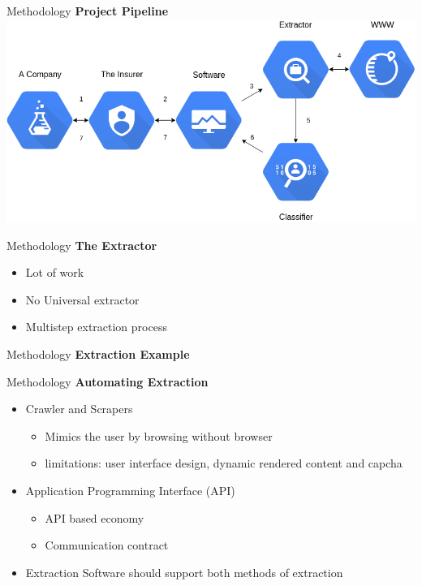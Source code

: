 \begin{frame}[label=metho]{Methodology}
	\textbf{Project Pipeline}
	\includegraphics[width=\textwidth]{images/project_pipeline.png}
\end{frame}


\begin{frame}[label=metho]{Methodology}
	\textbf{The Extractor}
	\begin{itemize}
		\item Lot of work
		\item No Universal extractor
		\item Multistep extraction process
	\end{itemize}
\end{frame}


\begin{frame}[label=metho]{Methodology}
	\textbf{Extraction Example}
	
\end{frame}



\begin{frame}[label=metho]{Methodology}
	\textbf{Automating Extraction}
	\begin{itemize}
		\item Crawler and Scrapers
		\begin{itemize}
			\item Mimics the user by browsing without browser
			\item limitations: user interface design, dynamic rendered content and capcha
		\end{itemize}		
		\item Application Programming Interface (API)
		\begin{itemize}
			\item API based economy
			\item Communication contract
		\end{itemize}	
		\item Extraction Software should support both methods of extraction
	\end{itemize}	
	
\end{frame}



